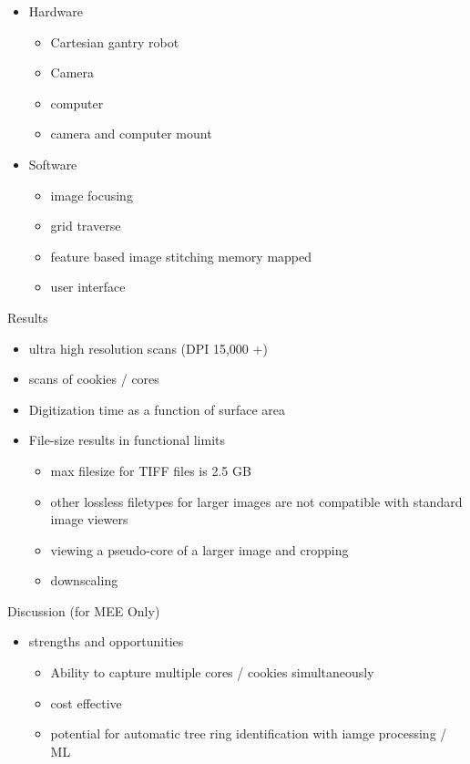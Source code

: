 \documentclass{article}
\begin{document}
\begin{outline}[itemize]
\begin{itemize}
		\begin{itemize}
		\item Hardware
			\begin{itemize}
			\item Cartesian gantry robot
			\item Camera
			\item computer
			\item camera and computer mount
			\end{itemize}
		\item Software
			\begin{itemize}
			\item image focusing
			\item grid traverse
			\item feature based image stitching
			\subitem memory mapped 
			\item user interface
			\end{itemize}
		\end{itemize}
	\end{itemize}
\item Results
	\begin{itemize}
	\item ultra high resolution scans (DPI 15,000 +)
	\item scans of cookies / cores
	\item  Digitization time as a function of surface area
	\item File-size results in functional limits 
		\begin{itemize}
		\item max filesize for TIFF files is 2.5 GB
		\item other lossless filetypes for larger images are not compatible with standard image viewers
		\item viewing a pseudo-core of a larger image and cropping 
		\item downscaling
		\end{itemize}
	\end{itemize}
\item Discussion (for MEE Only)
	\begin{itemize}
	\item strengths and opportunities
		\begin{itemize}
		\item  Ability to capture multiple cores / cookies simultaneously
		\item cost effective
		\item potential for automatic tree ring identification with iamge processing / ML 

\end{itemize}
\end{itemize}
\end{outline}
\end{document}
